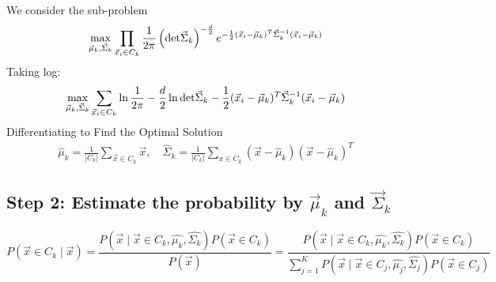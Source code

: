 \documentclass[11pt]{elegantbook}
\begin{document}
We consider the sub-problem
\begin{equation}
    \begin{aligned}
        \max_{\vec{\mu}_k,\vec{\Sigma}_k}\prod_{\vec{x}_i\in C_k}\frac{1}{2\pi}\left(\textnormal{det}\vec{\Sigma}_k\right)^{-\frac{d}{2}}e^{-\frac{1}{2}(\vec{x}_i-\vec{\mu}_k)^T \vec{\Sigma}_k^{-1}(\vec{x}_i-\vec{\mu}_k)}
    \end{aligned}
    \nonumber
\end{equation}
Taking log:
\begin{equation}
    \begin{aligned}
        \max_{\vec{\mu}_k,\vec{\Sigma}_k}\sum_{\vec{x}_i\in C_k}\ln\frac{1}{2\pi}-\frac{d}{2}\ln\textnormal{det}\vec{\Sigma}_k-\frac{1}{2}(\vec{x}_i-\vec{\mu}_k)^T \vec{\Sigma}_k^{-1}(\vec{x}_i-\vec{\mu}_k)
    \end{aligned}
    \nonumber
\end{equation}
Differentiating to Find the Optimal Solution
\begin{equation}
    \begin{aligned}
        \hat{\mu}_k=\frac{1}{|C_k|}\sum_{\vec{x}\in C_k}\vec{x},\quad \hat{\Sigma}_k=\frac{1}{|C_k|}\sum_{x\in C_k}(\vec{x}-\hat{\mu}_k)(\vec{x}-\hat{\mu}_k)^T
    \end{aligned}
    \nonumber
\end{equation}

\subsection{Step 2: Estimate the probability by $\vec{\mu}_k$ and $\vec{\Sigma}_k$}
\begin{equation}
    P\left(\vec{x} \in C_k \mid \vec{x}\right)=\frac{P\left(\vec{x} \mid \vec{x} \in C_k, \widehat{\mu_k}, \widehat{\Sigma_k}\right) P\left(\vec{x} \in C_k\right)}{P(\vec{x})}=\frac{P\left(\vec{x} \mid \vec{x} \in C_k, \widehat{\mu_k}, \widehat{\Sigma_k}\right) P\left(\vec{x} \in C_k\right)}{\sum_{j=1}^K P\left(\vec{x} \mid \vec{x} \in C_j, \widehat{\mu_j}, \widehat{\Sigma_j}\right) P\left(\vec{x} \in C_j\right)}
    \nonumber
\end{equation}
\end{document}

